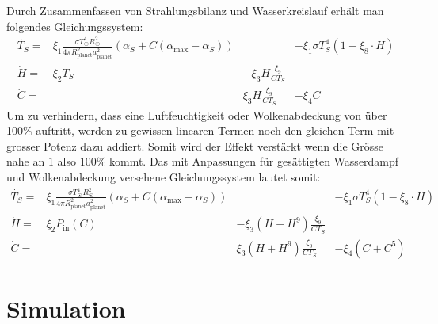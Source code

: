 \begin{refsection}
Durch Zusammenfassen von Strahlungsbilanz und Wasserkreislauf erhält man folgendes Gleichungssystem:
\begin{equation}
\begin{matrix}
\dot{T_S} = & \xi_1 \frac{\sigma T_{\astrosun}^4 R_{\astrosun}^2}{4 \pi R_{\text{planet}}^2 a_{\text{planet}}^2} (\alpha_S + C(\alpha_{\text{max}} - \alpha_S)) && - \xi_1 \sigma T_{S}^4  (1 - \xi_8 \cdot H)\\
\dot{H}   = & \xi_2 T_S              & - \xi_3 H \frac{\xi_9}{C T_S}          & \\
\dot{C}   = &                        &   \xi_3 H \frac{\xi_9}{C T_S}          & - \xi_4 C
\end{matrix}
\end{equation}
Um zu verhindern, dass eine Luftfeuchtigkeit oder Wolkenabdeckung von über 100\% auftritt, werden zu gewissen linearen Termen noch den gleichen Term mit grosser Potenz dazu addiert. Somit wird der Effekt verstärkt wenn die Grösse nahe an $1$ also $100\%$ kommt. Das mit Anpassungen für gesättigten Wasserdampf und Wolkenabdeckung versehene Gleichungssystem lautet somit:
\begin{equation}
\begin{matrix}
\dot{T_S} = & \xi_1 \frac{\sigma T_{\astrosun}^4 R_{\astrosun}^2}{4 \pi R_{\text{planet}}^2 a_{\text{planet}}^2} (\alpha_S + C(\alpha_{\text{max}} - \alpha_S)) && - \xi_1 \sigma T_{S}^4  (1 - \xi_8 \cdot H)\\
\dot{H}   = & \xi_2 P_{\text{in}}(C) & - \xi_3 (H + H^9) \frac{\xi_9}{C T_S}   &                   \\
\dot{C}   = &                        &   \xi_3 (H + H^9) \frac{\xi_9}{C T_S}   & - \xi_4 (C + C^5)
\end{matrix}
\end{equation}

\section{Simulation}


\end{refsection}
